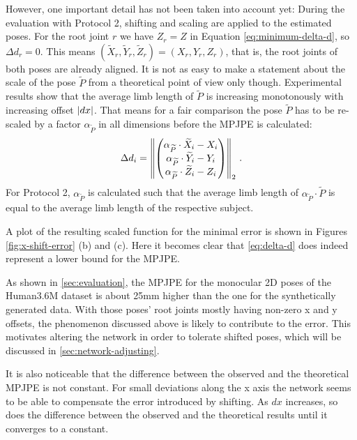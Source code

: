 However, one important detail has not been taken into account yet:
During the evaluation with Protocol 2, shifting and scaling are applied to the estimated poses. 
For the root joint $r$ we have $Z_r = Z$ in Equation \eqref{eq:minimum-delta-d}, so $\Delta d_r = 0$. 
This means $(\widetilde{X}_r, \widetilde{Y}_r, \widetilde{Z}_r) = (X_r, Y_r, Z_r)$, that is, the root joints of both poses are already aligned.
It is not as easy to make a statement about the scale of the pose $\widetilde{P}$ from a theoretical point of view only though.
Experimental results show that the average limb length of $\widetilde{P}$ is increasing monotonously with increasing offset $\abs{dx}$.
That means for a fair comparison the pose $\widetilde{P}$ has to be re-scaled by a factor $\alpha_{\widetilde{P}}$ in all dimensions before the MPJPE is calculated:
\begin{equation}
	\Delta d_i = \norm{ 
	\begin{pmatrix}
		\alpha_{\widetilde{P}} \cdot \widetilde{X}_i - X_i \\
		\alpha_{\widetilde{P}} \cdot \widetilde{Y}_i - Y_i \\
		\alpha_{\widetilde{P}} \cdot \widetilde{Z}_i - Z_i
	\end{pmatrix}
	}_2 \ .
\end{equation}
For Protocol 2, $\alpha_{\widetilde{P}}$ is calculated such that the average limb length of $\alpha_{\widetilde{P}} \cdot \widetilde{P}$ is equal to the average limb length of the respective subject.


 
A plot of the resulting scaled function for the minimal error is shown in Figures \ref{fig:x-shift-error} (b) and (c).
Here it becomes clear that \autoref{eq:delta-d} does indeed represent a lower bound for the MPJPE.

As shown in \autoref{sec:evaluation}, the MPJPE for the monocular 2D poses of the Human3.6M dataset is about 25mm higher than the one for the synthetically generated data.
With those poses' root joints mostly having non-zero x and y offsets, the phenomenon discussed above is likely to contribute to the error.
This motivates altering the network in order to tolerate shifted poses, which will be discussed in \autoref{sec:network-adjusting}.

It is also noticeable that the difference between the observed and the theoretical MPJPE is not constant.
For small deviations along the x axis the network seems to be able to compensate the error introduced by shifting.
As $dx$ increases, so does the difference between the observed and the theoretical results until it converges to a constant.

